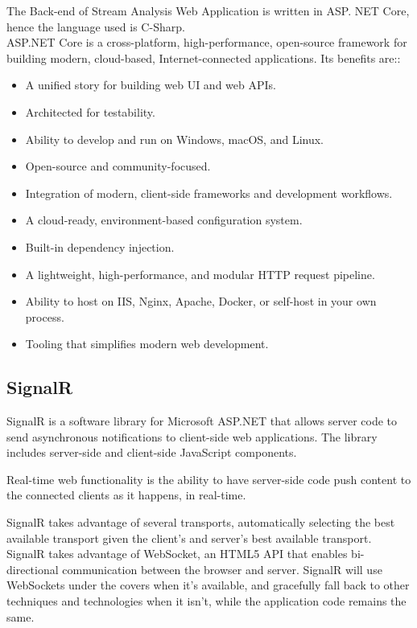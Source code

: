 The Back-end of Stream Analysis Web Application is written in ASP. NET Core, hence the language used is C-Sharp.\\

ASP.NET Core is a cross-platform, high-performance, open-source framework for building modern, cloud-based, Internet-connected applications. Its benefits are:\cite{asp-dotnet-core-description}:
\begin{itemize}
	\item A unified story for building web UI and web APIs.
	\item Architected for testability.
	\item Ability to develop and run on Windows, macOS, and Linux.
	\item Open-source and community-focused.
	\item Integration of modern, client-side frameworks and development workflows.
	\item A cloud-ready, environment-based configuration system.
	\item Built-in dependency injection.
	\item A lightweight, high-performance, and modular HTTP request pipeline.
	\item Ability to host on IIS, Nginx, Apache, Docker, or self-host in your own process.
	\item Tooling that simplifies modern web development.
\end{itemize}

\subsection{SignalR}
\label{chap:04:02:02}

SignalR is a software library for Microsoft ASP.NET that allows server code to send asynchronous notifications to client-side web applications. The library includes server-side and client-side JavaScript components.\cite{signalR-description}

Real-time web functionality is the ability to have server-side code push content to the connected clients as it happens, in real-time.\cite{signalR-description}

SignalR takes advantage of several transports, automatically selecting the best available transport given the client's and server's best available transport. SignalR takes advantage of WebSocket, an HTML5 API that enables bi-directional communication between the browser and server. SignalR will use WebSockets under the covers when it's available, and gracefully fall back to other techniques and technologies when it isn't, while the application code remains the same.\cite{signalR-description}

